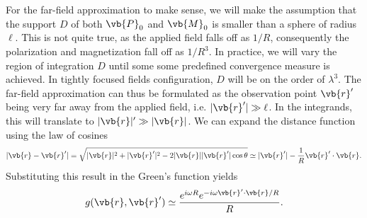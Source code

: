 \documentclass[11pt,SymmetricalJury]{inrsthesis/inrsthesis}
\begin{document}
For the far-field approximation to make sense, we will make the assumption
that the support $D$ of both $\vb{P}_0$ and $\vb{M}_0$ is smaller than a sphere of
radius $\ell$. This is not quite true, as the applied field falls off as
$1/R$, consequently the polarization and magnetization fall off as $1/R^3$.
In practice, we will vary the region of integration $D$ until some some predefined
convergence measure is achieved. In tightly focused fields configuration, $D$ will be
on the order of $\lambda^3$. The far-field approximation can thus be formulated
as the observation point $\vb{r}'$ being very far away from the applied field,
i.e. $|\vb{r}'|\gg\ell$. In the integrands, this will translate to $|\vb{r}|'\gg|\vb{r}|$.
We can expand the distance function using the law of cosines
  \begin{equation}
    |\vb{r}-\vb{r}'| = \sqrt{|\vb{r}|^2+|\vb{r}'|^2-2|\vb{r}||\vb{r}'|\cos\theta}\simeq |\vb{r}'|-\frac{1}{R}\vb{r}'\cdot\vb{r}.
  \end{equation}
Substituting this result in the Green's function yields
  \begin{equation}
    g(\vb{r},\vb{r}')\simeq \frac{e^{i\omega R}e^{-i\omega \vb{r}'\cdot\vb{r}/R}}{R}.
  \end{equation}
\end{document}
